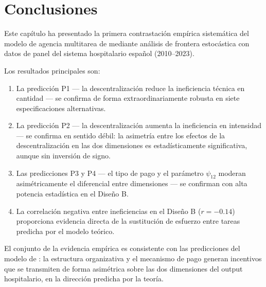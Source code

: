 \documentclass[12pt, a4paper]{article}
\begin{document}
\section{Conclusiones}

Este capítulo ha presentado la primera contrastación
empírica sistemática del modelo de agencia multitarea
de \citet{izquierdo2019} mediante análisis de frontera
estocástica con datos de panel del sistema hospitalario
español (2010--2023).

Los resultados principales son:

\begin{enumerate}
  \item La predicción P1 --- la descentralización reduce
    la ineficiencia técnica en cantidad --- se confirma
    de forma extraordinariamente robusta en siete
    especificaciones alternativas.

  \item La predicción P2 --- la descentralización aumenta
    la ineficiencia en intensidad --- se confirma en
    sentido débil: la asimetría entre los efectos de la
    descentralización en las dos dimensiones es
    estadísticamente significativa, aunque sin inversión
    de signo.

  \item Las predicciones P3 y P4 --- el tipo de pago y
    el parámetro $\psi_{12}$ moderan asimétricamente el
    diferencial entre dimensiones --- se confirman con
    alta potencia estadística en el Diseño B.

  \item La correlación negativa entre ineficiencias en
    el Diseño B ($r=-0.14$) proporciona evidencia
    directa de la sustitución de esfuerzo entre tareas
    predicha por el modelo teórico.
\end{enumerate}

El conjunto de la evidencia empírica es consistente con
las predicciones del modelo de \citet{izquierdo2019}:
la estructura organizativa y el mecanismo de pago
generan incentivos que se transmiten de forma asimétrica
sobre las dos dimensiones del output hospitalario, en
la dirección predicha por la teoría.


\newpage


\end{document}
